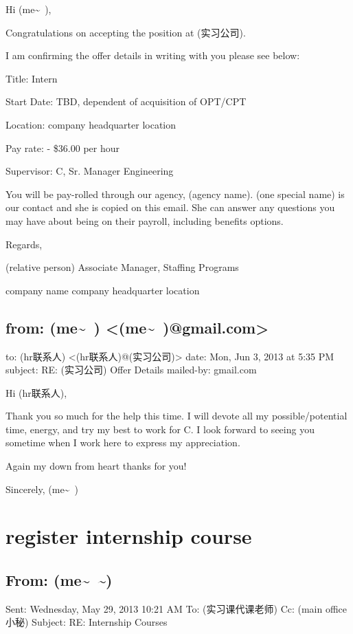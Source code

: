 \documentclass[12pt]{book}
\begin{document}
Hi (me\textasciitilde{}~),

Congratulations on accepting the position at (实习公司).  

I am confirming the offer details in writing with you please see below:

Title: Intern

Start Date:   TBD, dependent of acquisition of OPT/CPT  

Location: company headquarter location

Pay rate: - \$36.00 per hour  

Supervisor: C, Sr. Manager Engineering

You will be pay-rolled through our agency, (agency name).  (one special name) is our contact and she is copied on this email.  She can answer any questions you may have about being on their payroll, including benefits options.

Regards,

(relative person)
Associate Manager, Staffing Programs

company name 
company headquarter location


\section{from:         (me\textasciitilde{}~) <(me\textasciitilde{}~)@gmail.com>}
\label{sec-40-2}
to:         (hr联系人) <(hr联系人)@(实习公司)>
date:         Mon, Jun 3, 2013 at 5:35 PM
subject:         RE: (实习公司) Offer Details
mailed-by:         gmail.com

Hi (hr联系人),

Thank you so much for the help this time. I will devote all my possible/potential time, energy, and try my best to work for C.
I look forward to seeing you sometime when I work here to express my appreciation.

Again my down from heart thanks for you!

Sincerely,
(me\textasciitilde{}~)

\chapter{register internship course}
\label{sec-41}

\section{From: (me\textasciitilde{}~\textasciitilde{})}
\label{sec-41-1}
Sent: Wednesday, May 29, 2013 10:21 AM
To: (实习课代课老师)
Cc: (main office小秘)
Subject: RE: Internship Courses
\end{document}
